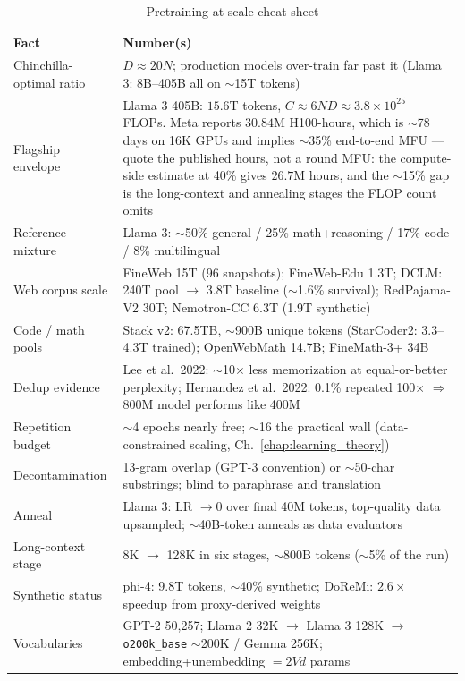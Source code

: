 \begin{table}[H]
\centering
\small
\caption{Pretraining-at-scale cheat sheet}
\label{tab:pretrain_cheatsheet}
\begin{tabularx}{\textwidth}{lX}
\toprule
\textbf{Fact} & \textbf{Number(s)} \\
\midrule
Chinchilla-optimal ratio & $D \approx 20N$; production models over-train far past it (Llama 3: 8B--405B all on $\sim$15T tokens) \\
Flagship envelope & Llama 3 405B: $15.6$T tokens, $C \approx 6ND \approx 3.8\times10^{25}$ FLOPs. Meta reports $30.84$M H100-hours, which is $\sim$78 days on 16K GPUs and implies $\sim$35\% end-to-end MFU --- quote the published hours, not a round MFU: the compute-side estimate at 40\% gives $26.7$M hours, and the $\sim$15\% gap is the long-context and annealing stages the FLOP count omits \\
Reference mixture & Llama 3: $\sim$50\% general / 25\% math+reasoning / 17\% code / 8\% multilingual \\
Web corpus scale & FineWeb 15T (96 snapshots); FineWeb-Edu 1.3T; DCLM: 240T pool $\rightarrow$ 3.8T baseline ($\sim$1.6\% survival); RedPajama-V2 30T; Nemotron-CC 6.3T (1.9T synthetic) \\
Code / math pools & Stack v2: 67.5TB, $\sim$900B unique tokens (StarCoder2: 3.3--4.3T trained); OpenWebMath 14.7B; FineMath-3+ 34B \\
Dedup evidence & Lee et al.\ 2022: $\sim$10$\times$ less memorization at equal-or-better perplexity; Hernandez et al.\ 2022: 0.1\% repeated 100$\times$ $\Rightarrow$ 800M model performs like 400M \\
Repetition budget & $\sim$4 epochs nearly free; $\sim$16 the practical wall (data-constrained scaling, Ch.~\ref{chap:learning_theory}) \\
Decontamination & 13-gram overlap (GPT-3 convention) or $\sim$50-char substrings; blind to paraphrase and translation \\
Anneal & Llama 3: LR $\rightarrow 0$ over final 40M tokens, top-quality data upsampled; $\sim$40B-token anneals as data evaluators \\
Long-context stage & 8K $\rightarrow$ 128K in six stages, $\sim$800B tokens ($\sim$5\% of the run) \\
Synthetic status & phi-4: 9.8T tokens, $\sim$40\% synthetic; DoReMi: $2.6\times$ speedup from proxy-derived weights \\
Vocabularies & GPT-2 50,257; Llama 2 32K $\rightarrow$ Llama 3 128K $\rightarrow$ \texttt{o200k\_base} $\sim$200K / Gemma 256K; embedding+unembedding $= 2Vd$ params \\
\bottomrule
\end{tabularx}
\end{table}

